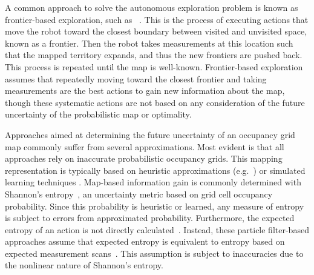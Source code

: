 \documentclass[letterpaper, 10pt, conference]{ieeeconf}
\begin{document}
A common approach to solve the autonomous exploration problem is known as frontier-based exploration, such as ~\cite{Yam97,Yam98}. This is the process of executing actions that move the robot toward the closest boundary between visited and unvisited space, known as a frontier.
Then the robot takes measurements at this location such that the mapped territory expands, and thus the new frontiers are pushed back. This process is repeated until the map is well-known.
Frontier-based exploration assumes that repeatedly moving toward the closest frontier and taking measurements are the best actions to gain new information about the map, though these systematic actions are not based on any consideration of the future uncertainty of the probabilistic map or optimality.


Approaches aimed at determining the future uncertainty of an occupancy grid map commonly suffer from several approximations.
Most evident is that all approaches rely on inaccurate probabilistic occupancy grids. This mapping representation is typically based on heuristic approximations (e.g.~\cite{MorElf85,Elf89,ChoLynHutKanBurKavThr05,And09,PirRutBisSch11}) or simulated learning techniques \cite{ThrBurFox05,Thr01}. Map-based information gain is commonly determined with Shannon's entropy~\cite{CarDamKumCas15}, an uncertainty metric based on grid cell occupancy probability. Since this probability is heuristic or learned, any measure of entropy is subject to errors from approximated probability.
Furthermore, the expected entropy of an action is not directly calculated~\cite{CarDamKumCas15,StaGriBur05}. Instead, these particle filter-based approaches assume that expected entropy is equivalent to entropy based on expected measurement scans~\cite{JohStaPfaBur07}. This assumption is subject to inaccuracies due to the nonlinear nature of Shannon's entropy. %
\end{document}

